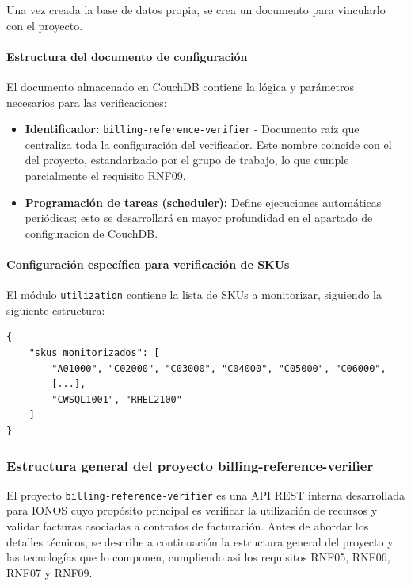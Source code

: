 Una vez creada la base de datos propia, se crea un documento para vincularlo con el proyecto.


\paragraph{Estructura del documento de configuración}
El documento almacenado en CouchDB contiene la lógica y parámetros necesarios para las verificaciones:

\begin{itemize}
    \item \textbf{Identificador:} \texttt{billing-reference-verifier} - Documento raíz que centraliza
          toda la configuración del verificador. Este nombre coincide con el del proyecto, estandarizado por el grupo de trabajo, lo que cumple parcialmente el requisito RNF09.

    \item \textbf{Programación de tareas (scheduler):} Define ejecuciones automáticas periódicas; esto se desarrollará en mayor profundidad en el apartado de configuracion de CouchDB.

\end{itemize}

\paragraph{Configuración específica para verificación de SKUs}
El módulo \texttt{utilization} contiene la lista de SKUs a monitorizar, siguiendo la siguiente estructura:

\begin{lstlisting}[caption=Almacenamiento SKUs en CouchDB, label=lst:producto-json]
{
    "skus_monitorizados": [
        "A01000", "C02000", "C03000", "C04000", "C05000", "C06000",
        [...],
        "CWSQL1001", "RHEL2100"
    ]
}
\end{lstlisting}
\subsubsection{Estructura general del proyecto billing-reference-verifier}

El proyecto \texttt{billing-reference-verifier} es una API REST interna desarrollada para IONOS
cuyo propósito principal es verificar la utilización de recursos y validar facturas asociadas a
contratos de facturación. Antes de abordar los detalles técnicos, se describe a continuación la estructura general del proyecto y las tecnologías que lo componen, cumpliendo asi los requisitos RNF05, RNF06, RNF07 y  RNF09.

